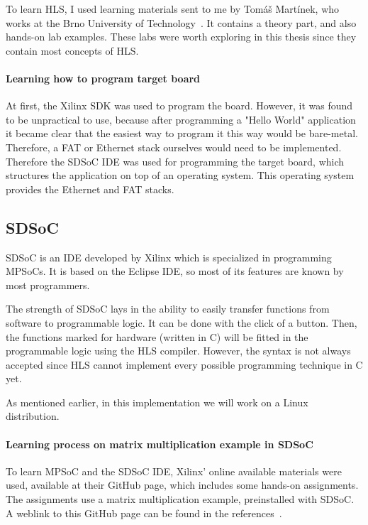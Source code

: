 To learn HLS, I used learning materials sent to me by Tom\'a\v s Mart\'inek, who works at the Brno University of Technology~\cite{martinek}. It contains a theory part,  and also hands-on lab examples. These labs were worth exploring in this thesis since they contain most concepts of HLS.

\paragraph{Learning how to program target board}

At first, the Xilinx SDK was used to program the board. However, it was found to be unpractical to use, because after programming a "Hello World" application it became clear that the easiest way to program it this way would be bare-metal. Therefore, a FAT or Ethernet stack ourselves would need to be implemented.
Therefore the SDSoC IDE was used for programming the target board, which structures the application on top of an operating system. This operating system provides the Ethernet and FAT stacks.

\subsection{SDSoC}

SDSoC is an IDE developed by Xilinx which is specialized in programming MPSoCs. It is based on the Eclipse IDE, so most of its features are known by most programmers. 

The strength of SDSoC lays in the ability to easily transfer functions from software to programmable logic. It can be done with the click of a button. Then, the functions marked for hardware (written in C) will be fitted in the programmable logic using the HLS compiler. However, the syntax is not always accepted since HLS cannot implement every possible programming technique in C yet.

As mentioned earlier, in this implementation we will work on a Linux distribution.

\paragraph{Learning process on matrix multiplication example in SDSoC}

To learn MPSoC and the SDSoC IDE, Xilinx' online available materials were used, available at their GitHub page, which includes some hands-on assignments. The assignments use a matrix multiplication example, preinstalled with SDSoC. A weblink to this GitHub page can be found in the references~\cite{sdsoc}.

